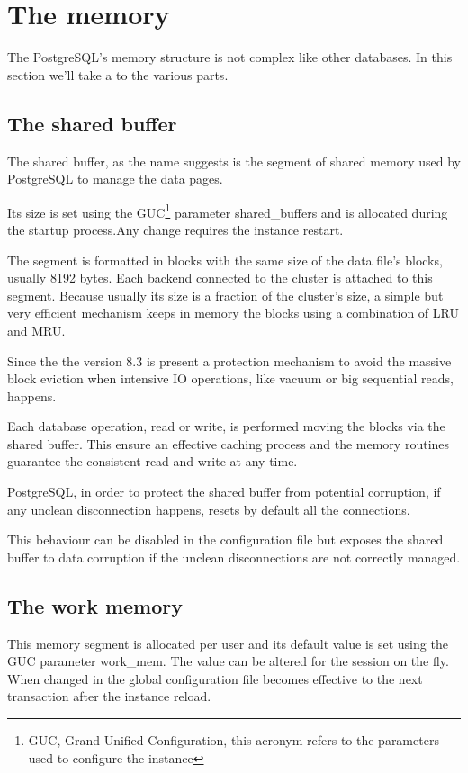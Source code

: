 \section{The memory}
\label{sec:MEMORY}
The PostgreSQL's memory structure is not complex like other databases.
In this section we'll take a to the various parts. 

\subsection{The shared buffer}
The shared buffer, as the name suggests is the segment of shared memory used by 
PostgreSQL to manage the data pages. 

Its size is set using the GUC\footnote{GUC, Grand Unified Configuration, this 
acronym refers to the parameters used to configure the instance} parameter 
shared\_buffers and is allocated 
during the startup process.Any change requires the instance restart.

The segment is formatted in blocks with the same size of the data file's 
blocks, usually 8192 bytes. Each backend connected to the cluster is attached 
to this segment. Because usually its size is a fraction of the cluster's size, 
a simple but very efficient mechanism keeps in memory the blocks using a 
combination of LRU and MRU.

Since the the version 8.3 is present a protection mechanism to avoid the 
massive block eviction when intensive IO operations, like vacuum or big 
sequential reads, happens.

Each database operation, read or write, is performed moving the blocks via the 
shared buffer. This ensure an effective caching process and the memory routines 
guarantee the consistent read and write at any time.

PostgreSQL, in order to protect the shared buffer from potential corruption, if 
any unclean disconnection happens, resets by default all the connections. 

This behaviour can be disabled in the configuration file but exposes the shared 
buffer to data corruption if the unclean disconnections are not correctly 
managed.



\subsection{The work memory}
\label{sub:WORKMEM}
This memory segment is allocated per user and its default value is set using 
the GUC parameter work\_mem. The value can be altered for the session on the 
fly. When changed in the global configuration file becomes effective to the 
next transaction after the instance reload. 


